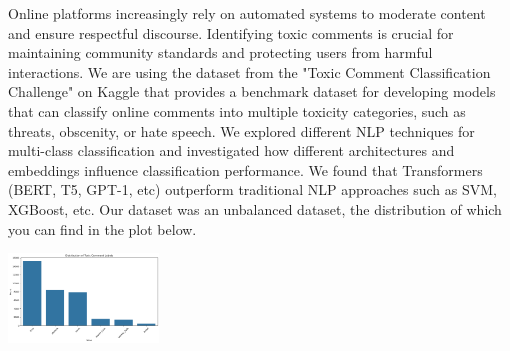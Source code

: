 

    {
        Online platforms increasingly rely on automated systems to moderate content and ensure respectful discourse. Identifying toxic comments is crucial for maintaining community standards and protecting users from harmful interactions. We are using the dataset from the "Toxic Comment Classification Challenge" \cite{jigsaw-toxic-comment-classification-challenge} on Kaggle that provides a benchmark dataset \cite{kaggle_toxic} for developing models that can classify online comments into multiple toxicity categories, such as threats, obscenity, or hate speech. We explored different NLP techniques for multi-class classification and investigated how different architectures and embeddings influence classification performance. We found that Transformers (BERT, T5, GPT-1, etc) outperform traditional NLP approaches such as SVM, XGBoost, etc. Our dataset was an unbalanced dataset, the distribution of which you can find in the plot below.

            \begin{center}
                \includegraphics[width=0.3\textwidth]{figures/dataset_distribution.png}
                \label{fig:dataset-distribution}
            \end{center}
    }

